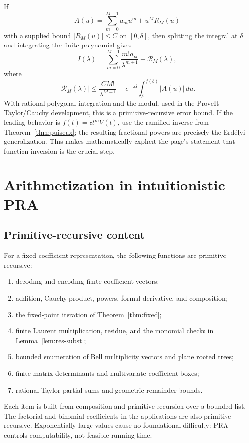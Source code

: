 \documentclass[11pt]{article}
\theoremstyle{definition}
\begin{document}
If
\[
 A(u)=\sum_{m=0}^{M-1}a_mu^m+u^MR_M(u)
\]
with a supplied bound \(|R_M(u)|\le C\) on \([0,\delta]\), then splitting the
integral at \(\delta\) and integrating the finite polynomial gives
\begin{equation}\label{eq:laplace-asymp}
 I(\lambda)
 =\sum_{m=0}^{M-1}\frac{m!a_m}{\lambda^{m+1}}
 +\mathcal R_M(\lambda),
\end{equation}
where
\[
 |\mathcal R_M(\lambda)|
 \le \frac{C M!}{\lambda^{M+1}}
 +e^{-\lambda\delta}\int_\delta^{f(b)}|A(u)|\,du.
\]
With rational polygonal integration and the moduli used in the ProveIt
Taylor/Cauchy development, this is a primitive-recursive error bound.  If the
leading behavior is \(f(t)=ct^mV(t)\), use the ramified inverse from
Theorem~\ref{thm:puiseux}; the resulting fractional powers are precisely the
Erd\'elyi generalization.  This makes mathematically explicit the page's
statement that function inversion is the crucial step.

\section{Arithmetization in intuitionistic PRA}\label{sec:ipra}

\subsection{Primitive-recursive content}

For a fixed coefficient representation, the following functions are primitive
recursive:
\begin{enumerate}[label=(\roman*)]
\item decoding and encoding finite coefficient vectors;
\item addition, Cauchy product, powers, formal derivative, and composition;
\item the fixed-point iteration of Theorem~\ref{thm:fixed};
\item finite Laurent multiplication, residue, and the monomial checks in
Lemma~\ref{lem:res-subst};
\item bounded enumeration of Bell multiplicity vectors and plane rooted trees;
\item finite matrix determinants and multivariate coefficient boxes;
\item rational Taylor partial sums and geometric remainder bounds.
\end{enumerate}
Each item is built from composition and primitive recursion over a bounded list.
The factorial and binomial coefficients in the applications are also primitive
recursive.  Exponentially large values cause no foundational difficulty: PRA
controls computability, not feasible running time.
\end{document}
